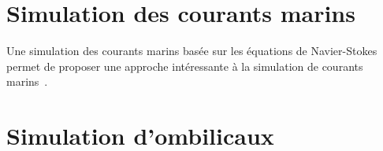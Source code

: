 	\section{Simulation des courants marins}

		Une simulation des courants marins basée sur les équations de Navier-Stokes permet de proposer une approche intéressante à la simulation de courants marins~\cite{Garau2006current}.

	\section{Simulation d'ombilicaux}

		
	